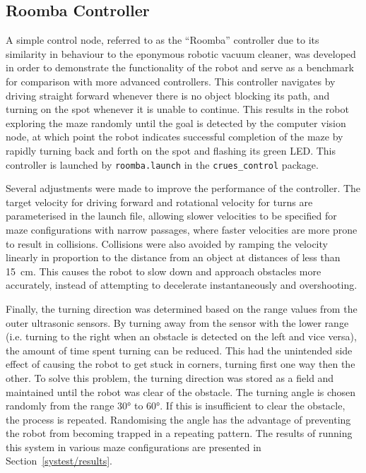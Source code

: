 \subsection{Roomba Controller}\label{soft/control/roomba}

A simple control node, referred to as the ``Roomba'' controller due to its
similarity in behaviour to the eponymous robotic vacuum cleaner, was developed
in order to demonstrate the functionality of the robot and serve as a
benchmark for comparison with more advanced controllers. This controller
navigates by driving straight forward whenever there is no object blocking
its path, and turning on the spot whenever it is unable to continue. This
results in the robot exploring the maze randomly until the goal is detected by
the computer vision node, at which point the robot indicates successful
completion of the maze by rapidly turning back and forth on the spot and
flashing its green LED. This controller is launched by \verb|roomba.launch|
in the \verb|crues_control| package.

Several adjustments were made to improve the performance of the controller.
The target velocity for driving forward and rotational velocity for turns are
parameterised in the launch file, allowing slower velocities to be specified
for maze configurations with narrow passages, where faster velocities are
more prone to result in collisions. Collisions were also avoided by ramping
the velocity linearly in proportion to the distance from an object at distances
of less than \SI{15}{\cm}. This causes the robot to slow down and approach
obstacles more accurately, instead of attempting to decelerate instantaneously
and overshooting.

Finally, the turning direction was determined based on the range values from
the outer ultrasonic sensors. By turning away from the sensor with the lower
range (i.e. turning to the right when an obstacle is detected on the left and
vice versa), the amount of time spent turning can be reduced. This had the
unintended side effect of causing the robot to get stuck
in corners, turning first one way then the other. To solve this problem, the
turning direction was stored as a field and maintained until the robot was clear
of the obstacle. The turning angle is chosen randomly from the range \ang{30}
to \ang{60}. If this is insufficient to clear the obstacle, the process is
repeated. Randomising the angle has the advantage of preventing the robot from
becoming trapped in a repeating pattern. The results of running this system in
various maze configurations are presented in Section~\ref{systest/results}.

